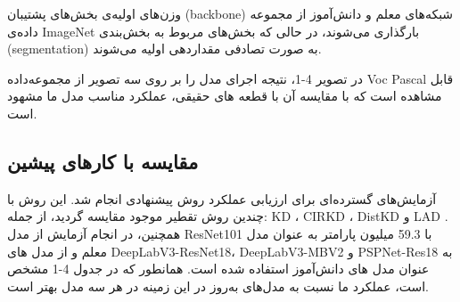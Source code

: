 وزن‌های اولیه‌ی بخش‌های پشتیبان (backbone) شبکه‌های معلم و دانش‌آموز از مجموعه داده‌ی ImageNet بارگذاری می‌شوند، در حالی که بخش‌های مربوط به بخش‌بندی (segmentation) به صورت تصادفی مقداردهی اولیه می‌شوند.



در تصویر 4-1، نتیجه اجرای مدل را بر روی سه تصویر از مجموعه‌داده Voc Pascal قابل مشاهده است که با مقایسه آن با قطعه های حقیقی، عملکرد مناسب مدل ما مشهود است.



\subsection{مقایسه با کار‌های پیشین}

آزمایش‌های گسترده‌ای برای ارزیابی عملکرد روش پیشنهادی انجام شد. این روش با چندین روش تقطیر موجود مقایسه گردید، از جمله: KD \cite{hinton2015distillingknowledgeneuralnetwork}، CIRKD \cite{yang2022crossimagerelationalknowledgedistillation}، DistKD \cite{huang2022knowledgedistillationstrongerteacher} و LAD \cite{Liu2024RethinkingKD}. همچنین، در انجام آزمایش از مدل ResNet101 با 59.3 میلیون پارامتر به عنوان مدل معلم و از مدل های DeepLabV3-ResNet18، DeepLabV3-MBV2 و PSPNet-Res18 به عنوان مدل های دانش‌آموز استفاده شده است.
همانطور که در جدول 4-1 مشخص است، عملکرد ما نسبت به مدل‌های به‌روز در این زمینه در هر سه مدل بهتر است.
‫‫




\pagebreak